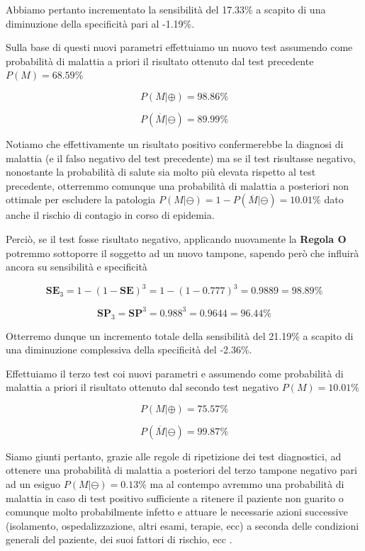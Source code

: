 \documentclass[11pt]{article}
\begin{document}
    Abbiamo pertanto incrementato la sensibilità del 17.33\% a scapito di
una diminuzione della specificità pari al -1.19\%.

Sulla base di questi nuovi parametri effettuiamo un nuovo test assumendo
come probabilità di malattia a priori il risultato ottenuto dal test
precedente \(P(M)=68.59\)\%

\[
P(M|\oplus) = 98.86\%
\]

\[
P(\overline{M}|\ominus) = 89.99\%
\]

    
    Notiamo che effettivamente un risultato positivo confermerebbe la
diagnosi di malattia (e il falso negativo del test precedente) ma se il
test risultasse negativo, nonostante la probabilità di salute sia molto
più elevata rispetto al test precedente, otterremmo comunque una
probabilità di malattia a posteriori non ottimale per escludere la
patologia \(P(M|\ominus) = 1 - P(\overline{M}|\ominus) = 10.01\)\% dato
anche il rischio di contagio in corso di epidemia.

    
    Perciò, se il test fosse risultato negativo, applicando nuovamente la
\textbf{Regola O} potremmo sottoporre il soggetto ad un nuovo tampone,
sapendo però che influirà ancora su sensibilità e specificità

\[
\mathbf{SE}_3 = 1 - (1 - \mathbf{SE})^3 = 1 - (1 - 0.777)^3 = 0.9889 = 98.89\%
\]

\[
\mathbf{SP}_3 = \mathbf{SP}^3 = 0.988^3 = 0.9644 = 96.44\%
\]

    
    Otterremo dunque un incremento totale della sensibilità del 21.19\% a
scapito di una diminuzione complessiva della specificità del -2.36\%.

Effettuiamo il terzo test coi nuovi parametri e assumendo come
probabilità di malattia a priori il risultato ottenuto dal secondo test
negativo \(P(M)=10.01\)\%

\[
P(M|\oplus) = 75.57\%
\]

\[
P(\overline{M}|\ominus) = 99.87\%
\]

    
    Siamo giunti pertanto, grazie alle regole di ripetizione dei test
diagnostici, ad ottenere una probabilità di malattia a posteriori del
terzo tampone negativo pari ad un esiguo \(P(M|\ominus)=0.13\)\% ma al
contempo avremmo una probabilità di malattia in caso di test positivo
sufficiente a ritenere il paziente non guarito o comunque molto
probabilmente infetto e attuare le necessarie azioni successive
(isolamento, ospedalizzazione, altri esami, terapie, ecc) a seconda
delle condizioni generali del paziente, dei suoi fattori di rischio, ecc
\cite{centers2020interim} \cite{bai2020presumed}
\cite{national2020coronavirus}.
\end{document}
